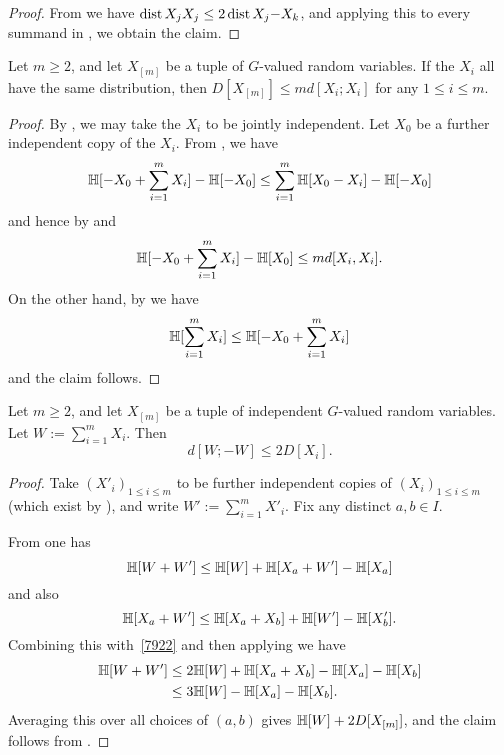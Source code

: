 \begin{proof}
From  we have $\operatorname{dist}{X_j}{X_j} \leq 2 \operatorname{dist}{X_j}{-X_k}$, and applying this to every summand in , we obtain the claim.
\end{proof}

\begin{lemma}\label{multidist-ruzsa-III}\leanok
  Let $m \ge 2$, and let $X_{[m]}$ be a tuple of $G$-valued random variables. If the $X_i$ all have the same distribution, then $D[X_{[m]}] \leq m d[X_i;X_i]$ for any $1 \leq i \leq m$.
\end{lemma}

\begin{proof}
  By ,  we may take the $X_i$ to be jointly independent.    Let $X_0$ be a further independent copy of the $X_i$.
From , we have
$$ \mathbb{H}[-X_0 + \sum_{i=1}^m X_i] - \mathbb{H}[-X_0] \leq \sum_{i=1}^m \mathbb{H}[X_0 - X_i] - \mathbb{H}[-X_0]$$
and hence by  and 
$$ \mathbb{H}[-X_0 + \sum_{i=1}^m X_i] - \mathbb{H}[X_0] \leq m d[X_i,X_i].$$
On the other hand, by  we have
$$ \mathbb{H}[\sum_{i=1}^m X_i] \leq \mathbb{H}[-X_0 + \sum_{i=1}^m X_i]$$
and the claim follows.
\end{proof}

\begin{lemma}\label{multidist-ruzsa-IV}\leanok
  Let $m \ge 2$, and let $X_{[m]}$ be a tuple of independent $G$-valued random variables.  Let $W := \sum_{i=1}^m X_i$. Then
  $$ d[W;-W] \leq 2 D[X_i].$$
\end{lemma}

\begin{proof}
  Take $(X'_i)_{1 \leq i \leq m}$ to be further independent copies of $(X_i)_{1 \leq i \leq m}$ (which exist by ), and write $W' := \sum_{i=1}^m X'_i$.
  Fix any distinct $a,b \in I$.

  From  one has
  \begin{equation}\label{7922}
    \mathbb{H}[W + W'] \leq  \mathbb{H}[W] + \mathbb{H}[X_{a} + W'] - \mathbb{H}[X_{a}]
   \end{equation}
   and also
   \[ \mathbb{H}[X_a + W'] \leq \mathbb{H}[X_a + X_b] + \mathbb{H}[W'] - \mathbb{H}[X'_b].\]
   Combining this with~\eqref{7922} and then applying  we have
   \begin{align*}  \mathbb{H}[W + W']  & \leq    2\mathbb{H}[W] + \mathbb{H}[X_a + X_b]  - \mathbb{H}[X_a] - \mathbb{H}[X_b] \\ & \leq
    3 \mathbb{H}[W] - \mathbb{H}[X_a] - \mathbb{H}[X_b].
  \end{align*}
  Averaging this over all choices of $(a,b)$ gives $\mathbb{H}[W] + 2 D[X_{[m]}]$, and the claim follows from .
\end{proof}

